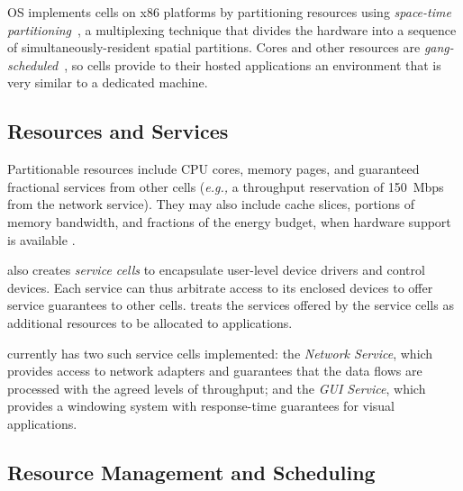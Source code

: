 \tess OS implements cells on x86 platforms by partitioning resources
using \emph{space-time partitioning}~\cite{rushby99,lei03}, 
a multiplexing technique that divides the hardware into a sequence of
simultaneously-resident spatial partitions. 
Cores and other resources are
\textit{gang-scheduled}~\cite{gangsched1982,gangschedpatent}, so
cells provide to their hosted applications an environment that is very
similar to a dedicated machine.

\subsection{Resources and Services} \label{sec:soa} 
Partitionable resources include CPU cores, memory pages, and guaranteed
fractional services from other cells (\emph{e.g.,} a throughput reservation of 150~Mbps
from the network service).  
They may also include cache slices, portions of memory bandwidth, and fractions
of the energy budget, when hardware support is available
\cite{akesson07,lee08memqos,paolieri09,sanchez11}.

\tess also creates \emph{service cells} to encapsulate user-level device drivers and control devices.
Each service can thus arbitrate access to its
enclosed devices to offer service guarantees to
other cells. \tess treats the services
offered by the service cells as additional resources to be allocated to applications.

\tess currently has two such service cells implemented:
the \emph{Network Service}, which provides access to network adapters and
guarantees that the data flows are processed with the agreed levels of
throughput; and the \emph{GUI Service}, which provides a windowing system with
response-time guarantees for visual applications.  


\subsection{Resource Management and Scheduling} 

